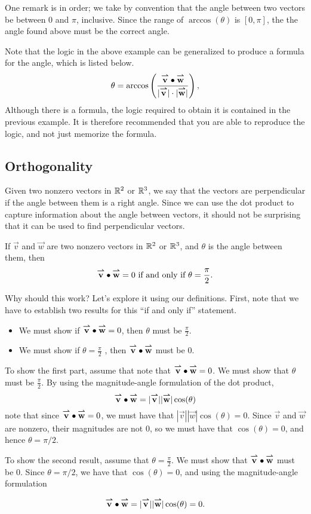 \documentclass{ximera}
\begin{document}
One remark is in order; we take by convention that the angle between two vectors be between $0$ and $\pi$, inclusive.  Since the range of $\arccos(\theta)$ is $[0,\pi]$, the the angle found above must be the correct angle.

Note that the logic in the above example can be generalized to produce a formula for the angle, which is listed below.
\[
\theta = \arccos\left(\frac{{\overset{\boldsymbol{\rightharpoonup}}{\mathbf{v}}} \bullet {\overset{\boldsymbol{\rightharpoonup}}{\mathbf{w}}}
}{|{\overset{\boldsymbol{\rightharpoonup}}{\mathbf{v}}}|\cdot|{\overset{\boldsymbol{\rightharpoonup}}{\mathbf{w}}}|}\right),
\]
Although there is a formula, the logic required to obtain it is contained in the previous example.  It is therefore recommended that you are able to reproduce the logic, and not just memorize the formula.

\subsection{Orthogonality}
Given two nonzero vectors in $\mathbb R^2$ or $\mathbb R^3$, we say that the vectors are perpendicular if the angle between them is a right angle.  Since we can use the dot product to capture information about the angle between vectors, it should not be surprising that it can be used to find perpendicular vectors.

\begin{theorem}
  If $\vec{v}$ and $\vec{w}$ are two nonzero vectors in $\mathbb R^2$ or $\mathbb R^3$, and $\theta$ is
  the angle between them, then
  \[
  {\overset{\boldsymbol{\rightharpoonup}}{\mathbf{v}}}\bullet {\overset{\boldsymbol{\rightharpoonup}}{\mathbf{w}}} = 0 \text{ if and only if } \theta=
  \frac{\pi}{2}.
  \]
\end{theorem}


\begin{explanation}
Why should this work?  Let's explore it using our definitions.  First, note that we have to establish two results for this ``if and only if'' statement.

\begin{itemize}
\item We must show if  ${\overset{\boldsymbol{\rightharpoonup}}{\mathbf{v}}}\bullet {\overset{\boldsymbol{\rightharpoonup}}{\mathbf{w}}} = 0$, then $\theta$ must be $\frac{\pi}{2}$.
\item We must show if $\theta = \frac{\pi}{2}$ , then ${\overset{\boldsymbol{\rightharpoonup}}{\mathbf{v}}}\bullet {\overset{\boldsymbol{\rightharpoonup}}{\mathbf{w}}}$ must be $0$.
\end{itemize}

To show the first part, assume that note that ${\overset{\boldsymbol{\rightharpoonup}}{\mathbf{v}}}\bullet {\overset{\boldsymbol{\rightharpoonup}}{\mathbf{w}}} = 0$.  We must show that $\theta$ must be $\frac{\pi}{2}$.  By using the magnitude-angle formulation of the dot product, 
\[
{\overset{\boldsymbol{\rightharpoonup}}{\mathbf{v}}}\bullet {\overset{\boldsymbol{\rightharpoonup}}{\mathbf{w}}} = |{\overset{\boldsymbol{\rightharpoonup}}{\mathbf{v}}}||{\overset{\boldsymbol{\rightharpoonup}}{\mathbf{w}}}|\cos(\theta) 
\]
note that since ${\overset{\boldsymbol{\rightharpoonup}}{\mathbf{v}}}\bullet {\overset{\boldsymbol{\rightharpoonup}}{\mathbf{w}}} = 0$, we must have that $|\vec{v}||\vec{w}|\cos(\theta)  = 0$.  Since $\vec{v}$ and $\vec{w}$ are nonzero, their magnitudes are not $0$, so we must have that $\cos(\theta) = 0$, and hence $\theta = \pi/2$.

To show the second result, assume that $\theta = \frac{\pi}{2}$.  We must show that ${\overset{\boldsymbol{\rightharpoonup}}{\mathbf{v}}}\bullet {\overset{\boldsymbol{\rightharpoonup}}{\mathbf{w}}}$ must be $0$.  Since $\theta = \pi/2$, we have that $\cos(\theta) = 0$, and using the magnitude-angle formulation

\[
{\overset{\boldsymbol{\rightharpoonup}}{\mathbf{v}}}\bullet {\overset{\boldsymbol{\rightharpoonup}}{\mathbf{w}}} = |{\overset{\boldsymbol{\rightharpoonup}}{\mathbf{v}}}||{\overset{\boldsymbol{\rightharpoonup}}{\mathbf{w}}}|\cos(\theta) = 0.
\]
\end{explanation}
\end{document}
